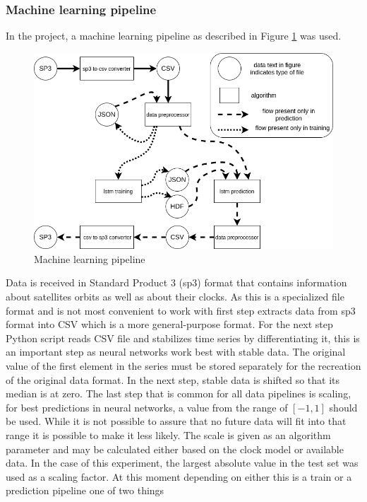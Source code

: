 \subsubsection{Machine learning pipeline}
In the project, a machine learning pipeline as described in Figure \ref{fig:pipeline} was used.
\begin{figure}[ht] 
	\centering
	\includegraphics[width=\textwidth]{figures/pipeline}
	\caption{Machine learning pipeline}
	\label{fig:pipeline}
\end{figure}
Data is received in Standard Product 3 (sp3) format that contains information about satellites
orbits as well as about their clocks.
As this is a specialized file format and is not most convenient to work with first step extracts
data from sp3 format into CSV which is a more general-purpose format.
For the next step Python script reads CSV file and stabilizes time series by differentiating it,
this is an important step as neural networks work best with stable data.
The original value of the first element in the series must be stored separately for the recreation
of the original data format. In the next step, stable data is shifted so that its median 
is at zero.
The last step that is common for all data pipelines is scaling, for best predictions in neural
networks, a value from the range of $[-1 , 1]$ should be used. While it is not possible 
to assure that no future data will fit into that range it is possible to make it less likely.
The scale is given as an algorithm parameter and may be calculated either based on the clock model
or available data. In the case of this experiment, the largest absolute value in the test set was
used as a scaling factor.
At this moment depending on either this is a train or a prediction pipeline one of two things
